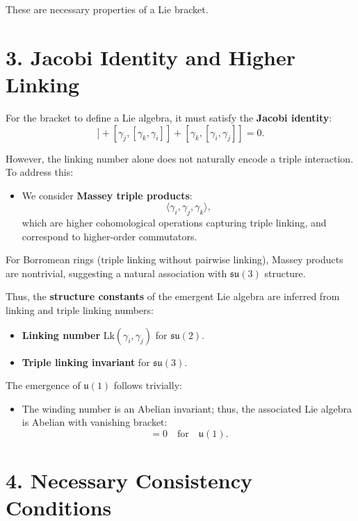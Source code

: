 \documentclass{article}
\begin{document}
These are necessary properties of a Lie bracket.

\section*{3. Jacobi Identity and Higher Linking}

For the bracket to define a Lie algebra, it must satisfy the \textbf{Jacobi identity}:
\begin{equation}
[\gamma_i, [\gamma_j, \gamma_k]] + [\gamma_j, [\gamma_k, \gamma_i]] + [\gamma_k, [\gamma_i, \gamma_j]] = 0.
\end{equation}

However, the linking number alone does not naturally encode a triple interaction. To address this:
\begin{itemize}
    \item We consider \textbf{Massey triple products}:
    \begin{equation}
    \langle \gamma_i, \gamma_j, \gamma_k \rangle,
    \end{equation}
    which are higher cohomological operations capturing triple linking, and correspond to higher-order commutators.
\end{itemize}

For Borromean rings (triple linking without pairwise linking), Massey products are nontrivial, suggesting a natural association with $\mathfrak{su}(3)$ structure.

Thus, the \textbf{structure constants} of the emergent Lie algebra are inferred from linking and triple linking numbers:
\begin{itemize}
    \item \textbf{Linking number} $\text{Lk}(\gamma_i, \gamma_j)$ for $\mathfrak{su}(2)$.
    \item \textbf{Triple linking invariant} for $\mathfrak{su}(3)$.
\end{itemize}

The emergence of $\mathfrak{u}(1)$ follows trivially:
\begin{itemize}
    \item The winding number is an Abelian invariant; thus, the associated Lie algebra is Abelian with vanishing bracket:
    \begin{equation}
    [\gamma_i, \gamma_j] = 0 \quad \text{for} \quad \mathfrak{u}(1).
    \end{equation}
\end{itemize}

\section*{4. Necessary Consistency Conditions}
\end{document}
